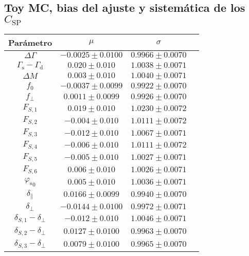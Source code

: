 \begin{subappendices}





\section{Toy MC, bias del ajuste y sistemática de los \texorpdfstring{$C_{\text{SP}}$}{CSP}}





\begin{table}[H]
  \centering
  \begin{tabular}{cccc}
  \toprule
  Parámetro & $\mu$ & $\sigma$ & \\ 
  \midrule
$\Delta \Gamma$ &  $-0.0025 \pm 0.0100$ &  $0.9966 \pm 0.0070$ & \\
$\Gamma_{\mathrm{s}} - \Gamma_{\mathrm{d}}$ &  $0.020 \pm 0.010$ &  $1.0038 \pm 0.0071$ & \\
$\Delta M$ &  $0.003 \pm 0.010$ &  $1.0040 \pm 0.0071$ & \\
$f_{0}$ &  $-0.0037 \pm 0.0099$ &  $0.9922 \pm 0.0070$ & \\
$f_{\perp}$ &  $0.0011 \pm 0.0099$ &  $0.9926 \pm 0.0070$ & \\
$F_{S,1}$ &  $0.019 \pm 0.010$ &  $1.0230 \pm 0.0072$ & \\
$F_{S,2}$ &  $-0.004 \pm 0.010$ &  $1.0111 \pm 0.0072$ & \\
$F_{S,3}$ &  $-0.012 \pm 0.010$ &  $1.0067 \pm 0.0071$ & \\
$F_{S,4}$ &  $-0.006 \pm 0.010$ &  $1.0111 \pm 0.0072$ & \\
$F_{S,5}$ &  $-0.005 \pm 0.010$ &  $1.0027 \pm 0.0071$ & \\
$F_{S,6}$ &  $0.006 \pm 0.010$ &  $1.0026 \pm 0.0071$ & \\
${\varphi_{\mathrm{s}}}_0$ &  $0.005 \pm 0.010$ &  $1.0036 \pm 0.0071$ & \\
$\delta_{\parallel}$ &  $0.0166 \pm 0.0099$ &  $0.9940 \pm 0.0070$ & \\
$\delta_{\perp}$ &  $-0.0144 \pm 0.0100$ &  $0.9972 \pm 0.0071$ & \\
$\delta_{S,1}- \delta_{\perp}$ &  $-0.012 \pm 0.010$ &  $1.0046 \pm 0.0071$ & \\
$\delta_{S,2}- \delta_{\perp}$ &  $0.0127 \pm 0.0100$ &  $0.9963 \pm 0.0070$ & \\
$\delta_{S,3}- \delta_{\perp}$ &  $0.0079 \pm 0.0100$ &  $0.9965 \pm 0.0070$ & \\

\end{tabular}
\end{table}
\end{subappendices}
